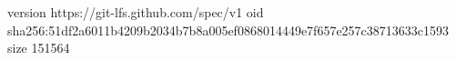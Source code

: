 version https://git-lfs.github.com/spec/v1
oid sha256:51df2a6011b4209b2034b7b8a005ef0868014449e7f657e257c38713633c1593
size 151564
